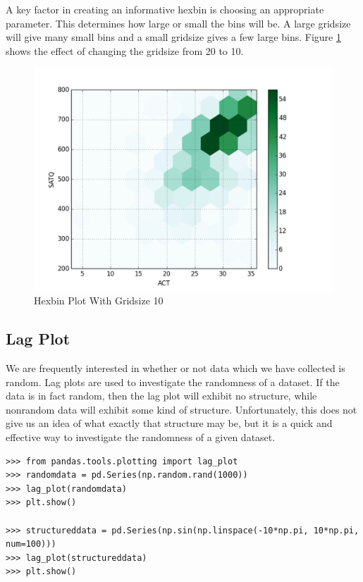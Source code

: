 A key factor in creating an informative hexbin is choosing an appropriate  parameter. This determines how large or small the bins will be. A large gridsize will give many small bins and a small gridsize gives a few large bins. Figure \ref{fig:hex} shows the effect of changing the gridsize from 20 to 10.

\begin{figure}[H]
    \centering
    \includegraphics[width=.75\textwidth]{hexbin.pdf}
    \caption{Hexbin Plot With Gridsize 10}
    \label{fig:hex}
\end{figure}


\subsection*{Lag Plot}
 We are frequently interested in whether or not data which we have collected is random. Lag plots are used to investigate the randomness of a dataset. If the data is in fact random, then the lag plot will exhibit no structure, while nonrandom data will exhibit some kind of structure. Unfortunately, this does not give us an idea of what exactly that structure may be, but it is a quick and effective way to investigate the randomness of a given dataset.
\begin{lstlisting}
>>> from pandas.tools.plotting import lag_plot
>>> randomdata = pd.Series(np.random.rand(1000))
>>> lag_plot(randomdata)
>>> plt.show()

>>> structureddata = pd.Series(np.sin(np.linspace(-10*np.pi, 10*np.pi, num=100)))
>>> lag_plot(structureddata)
>>> plt.show()
\end{lstlisting}


